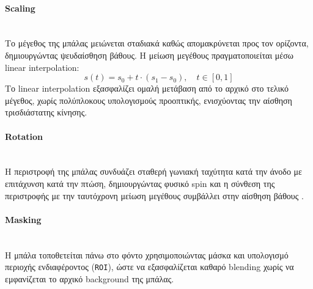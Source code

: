 \documentclass[12pt]{article}
\begin{document}
\paragraph{Scaling}
\mbox{}\\
Το μέγεθος της μπάλας μειώνεται σταδιακά καθώς απομακρύνεται προς τον ορίζοντα, δημιουργώντας ψευδαίσθηση βάθους. Η μείωση μεγέθους πραγματοποιείται μέσω linear interpolation:
\[
s(t) = s_0 + t \cdot (s_1 - s_0), \quad t \in [0,1]
\]
Το linear interpolation εξασφαλίζει ομαλή μετάβαση από το αρχικό στο τελικό μέγεθος, χωρίς πολύπλοκους υπολογισμούς προοπτικής, ενισχύοντας την αίσθηση τρισδιάστατης κίνησης.

\paragraph{Rotation}
\mbox{}\\
Η περιστροφή της μπάλας συνδυάζει σταθερή γωνιακή ταχύτητα κατά την άνοδο με επιτάχυνση κατά την πτώση, δημιουργώντας φυσικό spin και
 η σύνθεση της περιστροφής με την ταυτόχρονη μείωση μεγέθους συμβάλλει στην αίσθηση βάθους .

\paragraph{Masking}
\mbox{}\\
Η μπάλα τοποθετείται πάνω στο φόντο χρησιμοποιώντας μάσκα και υπολογισμό περιοχής ενδιαφέροντος (\texttt{ROI}), ώστε να εξασφαλίζεται καθαρό blending χωρίς να εμφανίζεται το αρχικό background της μπάλας.
\end{document}

